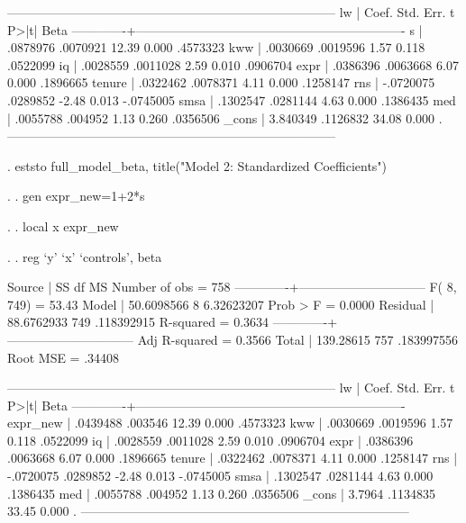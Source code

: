 \documentclass[12pt]{article}
\begin{document}
\begin{stlog}
------------------------------------------------------------------------------
          lw |      Coef.   Std. Err.      t    P>|t|                     Beta
-------------+----------------------------------------------------------------
           s |   .0878976   .0070921    12.39   0.000                 .4573323
         kww |   .0030669   .0019596     1.57   0.118                 .0522099
          iq |   .0028559   .0011028     2.59   0.010                 .0906704
        expr |   .0386396   .0063668     6.07   0.000                 .1896665
      tenure |   .0322462   .0078371     4.11   0.000                 .1258147
         rns |  -.0720075   .0289852    -2.48   0.013                -.0745005
        smsa |   .1302547   .0281144     4.63   0.000                 .1386435
         med |   .0055788    .004952     1.13   0.260                 .0356506
       _cons |   3.840349   .1126832    34.08   0.000                        .
------------------------------------------------------------------------------

. eststo full_model_beta, title("Model 2: Standardized Coefficients")

. 
. gen expr_new=1+2*s

. 
. local x expr_new

. 
. reg `y' `x' `controls', beta

      Source |       SS       df       MS              Number of obs =     758
-------------+------------------------------           F(  8,   749) =   53.43
       Model |  50.6098566     8  6.32623207           Prob > F      =  0.0000
    Residual |  88.6762933   749  .118392915           R-squared     =  0.3634
-------------+------------------------------           Adj R-squared =  0.3566
       Total |   139.28615   757  .183997556           Root MSE      =  .34408

------------------------------------------------------------------------------
          lw |      Coef.   Std. Err.      t    P>|t|                     Beta
-------------+----------------------------------------------------------------
    expr_new |   .0439488    .003546    12.39   0.000                 .4573323
         kww |   .0030669   .0019596     1.57   0.118                 .0522099
          iq |   .0028559   .0011028     2.59   0.010                 .0906704
        expr |   .0386396   .0063668     6.07   0.000                 .1896665
      tenure |   .0322462   .0078371     4.11   0.000                 .1258147
         rns |  -.0720075   .0289852    -2.48   0.013                -.0745005
        smsa |   .1302547   .0281144     4.63   0.000                 .1386435
         med |   .0055788    .004952     1.13   0.260                 .0356506
       _cons |     3.7964   .1134835    33.45   0.000                        .
------------------------------------------------------------------------------

\end{stlog}
\end{document}
